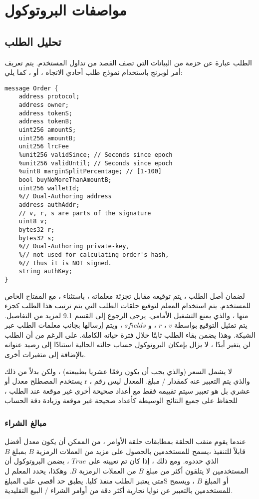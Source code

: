 \documentclass[12pt, a4paper, leqno]{report}
\theoremstyle{plain}
\theoremstyle{definition}
\begin{document}
\chapter{مواصفات البروتوكول}
\begin{multicols}{2}
\section{تحليل الطلب}
\begin{otherlanguage}{arabic}
الطلب عبارة عن حزمة من البيانات التي تصف القصد من تداول المستخدم. يتم تعريف أمر لوبرنج باستخدام نموذج طلب أحادي الاتجاه ، أو  ، كما يلي:

\begin{otherlanguage}{english}
\begin{verbatim}
message Order {
	address protocol;
	address owner;
	address tokenS;
	address tokenB;
	uint256 amountS;
	uint256 amountB;
	unit256 lrcFee
	%unit256 validSince; // Seconds since epoch
	%unit256 validUntil; // Seconds since epoch
	%uint8 marginSplitPercentage; // [1-100]
	bool buyNoMoreThanAmountB;
	uint256 walletId;
	%// Dual-Authoring address
	address authAddr;
	// v, r, s are parts of the signature
	uint8 v;
	bytes32 r;
	bytes32 s;
	%// Dual-Authoring private-key,
	%// not used for calculating order's hash,
	%// thus it is NOT signed.
	string authKey;
}
\end{verbatim}
\end{otherlanguage}

لضمان أصل الطلب ، يتم توقيعه مقابل تجزئة معلماته ، باستثناء  ، مع المفتاح الخاص للمستخدم. يتم استخدام المعلم  لتوقيع حلقات الطلب التي يتم ترتيب هذا الطلب كجزء منها ، والذي يمنع التشغيل الأمامي. يرجى الرجوع إلى القسم 9.1 لمزيد من التفاصيل. يتم تمثيل التوقيع بواسطة $v$ ، $r$ ، و $sfields$ ، ويتم إرسالها بجانب معلمات الطلب عبر الشبكة. وهذا يضمن بقاء الطلب ثابتًا خلال فترة حياته الكاملة. على الرغم من أن الطلب لن يتغير أبدًا ، لا يزال بإمكان البروتوكول حساب حالته الحالية استنادًا إلى رصيد عنوانه بالإضافة إلى متغيرات أخرى.

لا يشمل  السعر (والذي يجب أن يكون رقمًا عشريا بطبيعته) ، ولكن بدلاً من ذلك يستخدم المصطلح معدل أو r ، والذي يتم التعبير عنه كمقدار / مبلغ. المعدل ليس رقم عشري بل هو تعبير سيتم تقييمه فقط مع أعداد صحيحة أخرى غير موقعة عند الطلب ، للحفاظ على جميع النتائج الوسيطة كأعداد صحيحة غير موقعة وزيادة دقة الحساب
\subsection{مبالغ الشراء}
عندما يقوم منقب الحلقة بمطابقات حلقة الأوامر ، من الممكن أن يكون معدل أفضل قابلاً للتنفيذ ،يسمح للمستخدمين بالحصول على مزيد من العملات الرمزية $B$ بمبلغ $B$ الذي حددوه. ومع ذلك ، إذا كان  تم تعيينه على $True$ ، يضمن البروتوكول أن المستخدمين لا يتلقون أكثر من مبلغ $B$ من العملات الرمزية $B$. وهكذا، يحدد المعلم  ل  متى يعتبر الطلب منفذ كليا.  يطبق حد أقصى على المبلغS  أو المبلغ $B$  ، ويسمح للمستخدمين بالتعبير عن نوايا تجارية أكثر دقة من أوامر الشراء / البيع التقليدية.


\end{otherlanguage}
\end{multicols}
\end{document}
